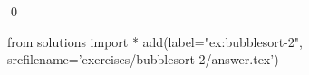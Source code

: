 \begin{ex}
  \label{ex:bubblesort-2}
  
  \mbox{}\\ \\
  \qed
\end{ex}
\begin{python0}
from solutions import *
add(label="ex:bubblesort-2",
    srcfilename='exercises/bubblesort-2/answer.tex') 
\end{python0}                              
